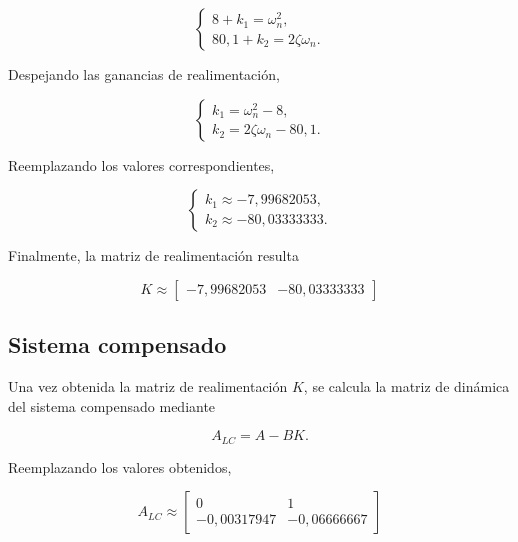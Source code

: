 \documentclass[10pt]{article}
\begin{document}
\begin{equation}
    \begin{cases}
        8+k_1=\omega_n^2,\\
        80{,}1+k_2=2\zeta\omega_n.
    \end{cases}
\end{equation}

Despejando las ganancias de realimentación,

\begin{equation}
    \begin{cases}
        k_1=\omega_n^2-8,\\
        k_2=2\zeta\omega_n-80{,}1.
    \end{cases}
\end{equation}

Reemplazando los valores correspondientes,

\begin{equation}
    \begin{cases}
        k_1\approx-7{,}99682053,\\
        k_2\approx-80{,}03333333.
    \end{cases}
\end{equation}

Finalmente, la matriz de realimentación resulta

\begin{equation}
    \boxed{
        K\approx
        \begin{bmatrix}
            -7{,}99682053 & -80{,}03333333
        \end{bmatrix}
    }
    \label{eq:ej8_ganancias}
\end{equation}


\subsection{Sistema compensado}

Una vez obtenida la matriz de realimentación $K$,
se calcula la matriz de dinámica del sistema
compensado mediante

\begin{equation}
    A_{LC}=A-BK.
\end{equation}

Reemplazando los valores obtenidos,

\begin{equation}
    \boxed{
        A_{LC}\approx
        \begin{bmatrix}
            0 & 1\\
            -0{,}00317947 & -0{,}06666667
        \end{bmatrix}
    }
    \label{eq:ej8_alc}
\end{equation}
\end{document}
